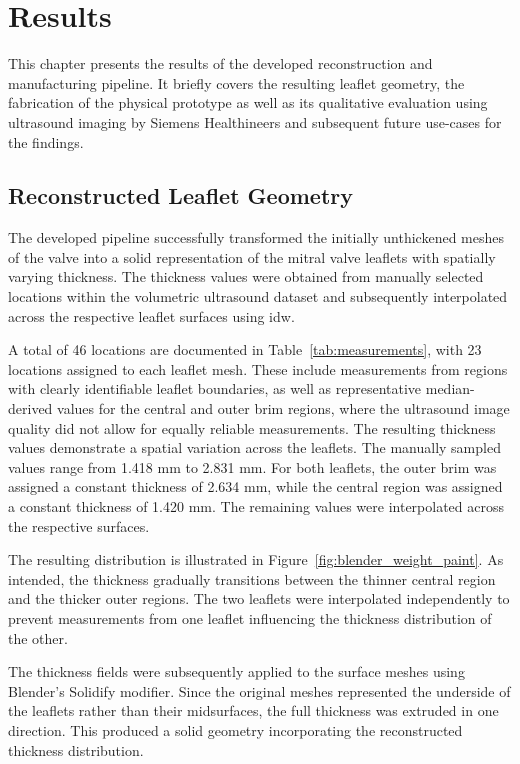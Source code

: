 \chapter{Results}\label{chap:results}

This chapter presents the results of the developed reconstruction and manufacturing pipeline. It briefly covers the resulting leaflet geometry, the fabrication of the physical prototype as well as its qualitative evaluation using ultrasound imaging by Siemens Healthineers and subsequent future use-cases for the findings.

\section{Reconstructed Leaflet Geometry}\label{sec:geometry}

The developed pipeline successfully transformed the initially unthickened meshes of the valve into a solid representation of the mitral valve leaflets with spatially varying thickness. The thickness values were obtained from manually selected locations within the volumetric ultrasound dataset and subsequently interpolated across the respective leaflet surfaces using \gls{idw}.

A total of 46 locations are documented in Table~\ref{tab:measurements}, with 23 locations assigned to each leaflet mesh. These include measurements from regions with clearly identifiable leaflet boundaries, as well as representative median-derived values for the central and outer brim regions, where the ultrasound image quality did not allow for equally reliable measurements. The resulting thickness values demonstrate a spatial variation across the leaflets. The manually sampled values range from  1.418 mm to 2.831 mm. For both leaflets, the outer brim was assigned a constant thickness of 2.634 mm, while the central region was assigned a constant thickness of 1.420 mm. The remaining values were interpolated across the respective surfaces.

The resulting distribution is illustrated in Figure~\ref{fig:blender_weight_paint}. As intended, the thickness gradually transitions between the thinner central region and the thicker outer regions. The two leaflets were interpolated independently to prevent measurements from one leaflet influencing the thickness distribution of the other.

The thickness fields were subsequently applied to the surface meshes using Blender's Solidify modifier. Since the original meshes represented the underside of the leaflets rather than their midsurfaces, the full thickness was extruded in one direction. This produced a solid geometry incorporating the reconstructed thickness distribution.

